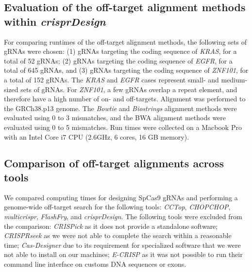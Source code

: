 \documentclass[pdftex,english,10pt]{article}
\begin{document}
{%
\subsection*{Evaluation of the off-target alignment methods within \textit{crisprDesign}}

For comparing runtimes of the off-target alignment methods, the following sets of gRNAs were chosen:  (1) gRNAs targeting the coding sequence of \textit{KRAS}, for a total of 52 gRNAs; (2) gRNAs targeting the coding sequence of \textit{EGFR}, for a total of 645 gRNAs, and (3) gRNAs targeting the coding sequence of \textit{ZNF101}, for a total of 152 gRNAs. The \textit{KRAS} and \textit{EGFR} cases represent small- and medium-sized sets of gRNAs. For \textit{ZNF101}, a few gRNAs overlap a repeat element, and therefore have a high number of on- and off-targets. Alignment was performed to the GRCh38.p13 genome. The \textit{Bowtie} and \textit{Biostrings} alignment methods were evaluated using 0 to 3 mismatches, and the BWA alignment methods were evaluated using 0 to 5 mismatches. Run times were collected on a Macbook Pro with an Intel Core i7 CPU (2.6GHz, 6 cores, 16 GB memory).



\subsection*{Comparison of off-target alignments across tools}

We compared computing times for designing SpCas9 gRNAs and performing a genome-wide off-target search for the following tools: \textit{CCTop}, \textit{CHOPCHOP}, \textit{multicrispr}, \textit{FlashFry}, and \textit{crisprDesign}. The following tools were excluded from the comparison: \textit{CRISPick} as it does not provide a standalone software; \textit{CRISPRseek} as we were not able to complete the search within a reasonable time; \textit{Cas-Designer} due to its requirement for specialized software that we were not able to install on our machines; \textit{E-CRISP} as it was not possible to run their command line interface on customs DNA sequences or exons. 

}
\end{document}
